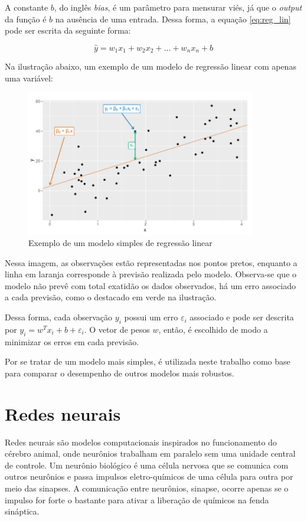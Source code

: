 A constante $b$, do inglês \textit{bias}, é um parâmetro para
mensurar viés, já que o \textit{output} da função é $b$ na ausência
de uma entrada. Dessa forma, a equação \ref{eq:reg_lin} pode ser escrita da 
seguinte forma: 

\begin{equation}
  \hat{y} = w_1 x_1 + w_2 x_2 + ... + w_n x_n + b
\end{equation}

Na ilustração abaixo, um exemplo de um modelo de regressão 
linear com apenas uma variável:

\begin{figure}[H] 
  \includegraphics[width= 10cm]{../figuras/reg_lin.png}
  \caption{Exemplo de um modelo simples de regressão linear
  \cite{forecasting}}
  \label{fig:reg_lin}
\end{figure}

Nessa imagem, as observações estão 
representadas nos pontos pretos, enquanto a linha em laranja
corresponde à previsão realizada pelo modelo. Observa-se que
o modelo não prevê com total exatidão os dados observados, há 
um erro associado a cada previsão, como o destacado em verde 
na ilustração.

Dessa forma, cada observação $y_i$ possui um erro ${\varepsilon}_i$ 
associado e pode ser descrita por $y_i = w^T x_i + b + {\varepsilon}_i$.
O vetor de pesos $w$, então, é escolhido de modo a minimizar 
os erros em cada previsão.

Por se tratar de um modelo mais simples, é utilizada neste trabalho como base 
para comparar o desempenho de outros modelos mais robustos.

\section{Redes neurais}

Redes neurais são modelos computacionais inspirados no funcionamento
do cérebro animal, onde neurônios trabalham em paralelo sem 
uma unidade central de controle. Um neurônio biológico é uma célula 
nervosa que se comunica com outros neurônios e passa impulsos 
eletro-químicos de uma célula para outra por meio das sinapses.
A comunicação entre neurônios, sinapse, ocorre apenas se o impulso 
for forte o bastante para ativar a liberação de
químicos na fenda sináptica.

